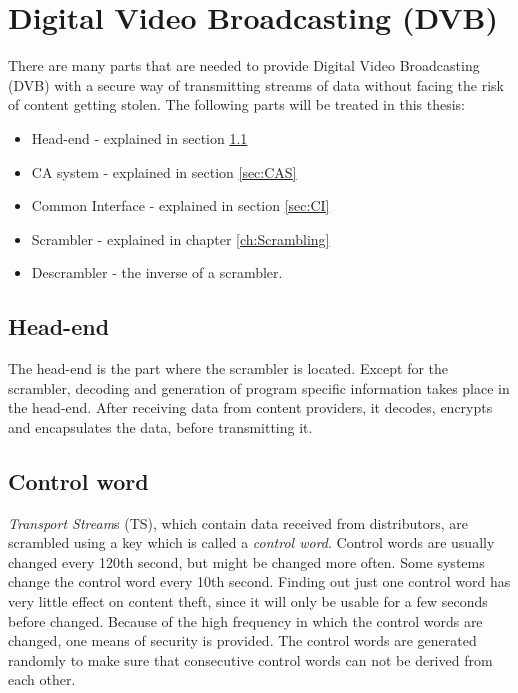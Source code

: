 \chapter{Digital Video Broadcasting (DVB)}
There are many parts that are needed to provide Digital Video 
Broadcasting (DVB) with a secure way of transmitting streams of data 
without facing the risk of content getting stolen. The following parts 
will be treated in this thesis:

\begin{itemize}
\item Head-end - explained in section \ref{sec:HE}
\item CA system - explained in section \ref{sec:CAS}
\item Common Interface - explained in section \ref{sec:CI}
\item Scrambler - explained in chapter \ref{ch:Scrambling}
\item Descrambler - the inverse of a scrambler.
\end{itemize}

\section{Head-end} \label{sec:HE}
The head-end is the part where the scrambler is located. Except for the 
scrambler, decoding and generation of program specific information takes
place in the head-end. After receiving data from content providers, it 
decodes, encrypts and encapsulates the data, before transmitting it.

\section{Control word} \label{sec:setup}
\emph{Transport Stream}s (TS), which contain data received from 
distributors, are scrambled using a key which is called a \emph{control 
word}. Control words are usually changed every 120th second, but might 
be changed more often. Some systems change the control word every 10th 
second. Finding out just one control word has very little effect on 
content theft, since it will only be usable for a few seconds before 
changed. Because of the high frequency in which the control words are 
changed, one means of security is provided. The control words are 
generated randomly to make sure that consecutive control words can not 
be derived from each other.

